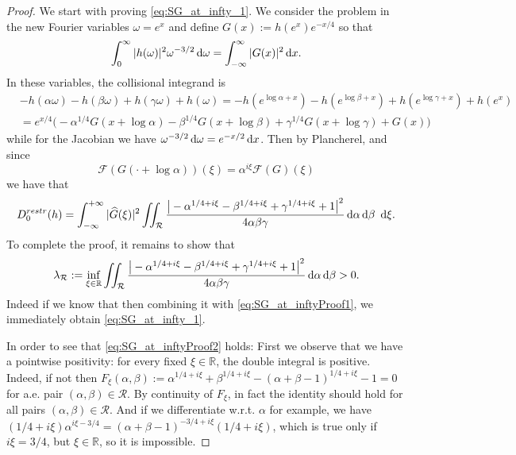 \documentclass[reqno,11pt,letterpaper]{amsart}
\numberwithin{equation}{section}
\newcommand{\dd}{\, {\rm d}}
\begin{document}
\begin{proof}
    We start with proving \eqref{eq:SG_at_infty_1}. We consider the problem in the new Fourier variables $\omega =e^x $ and define $G(x) := h(e^x) e^{-x/4}$ so that 
    \begin{align} \label{eq:SG_at_inftyProof1}
        \int_0^\infty |h(\omega)|^2\omega^{-3/2} \dd\omega = \int_{-\infty}^\infty |G(x)|^2 \dd x.
    \end{align} 
    In these variables, the collisional integrand is
\begin{align*}
    &- h(\alpha \omega) - h(\beta \omega) + h(\gamma \omega) + h(\omega) = - h(e^{\log \alpha + x}) - h(e^{\log \beta + x}) + h(e^{\log \gamma + x}) + h(e^x)
    \\ & = e^{x/4} \Big( -\alpha^{1/4} G(x+\log \alpha) -\beta^{1/4} G(x+\log \beta) + \gamma^{1/4} G(x+\log \gamma) + G(x) \Big)  
\end{align*}
while for the Jacobian we have $\omega^{-3/2}\dd\omega = e^{-x/2}\dd x$. Then by Plancherel, and since 
$$ \mathcal{F}(G(\cdot+\log \alpha))(\xi) = \alpha^{i\xi} \mathcal{F}(G)(\xi)$$ we have that 
$$
D_0^{restr}(h) = \int_{-\infty}^{+\infty} |\widehat{G}(\xi)|^2 \iint_{\mathcal{R}} \frac{\big\vert -\alpha^{1/4+i\xi} - \beta^{1/4+i\xi}+
            \gamma^{1/4+i\xi}+1
        \big\vert^2}{4\alpha\beta\gamma} 
 \dd\alpha\dd\beta\ \dd \xi.
$$
To complete the proof, it remains to show that \begin{align}\label{eq:SG_at_inftyProof2}
    \lambda_{\mathcal{R}}:= \inf_{\xi \in \mathbb{R}} \iint_{\mathcal{R}} \frac{\big\vert -\alpha^{1/4+i\xi} - \beta^{1/4+i\xi}+
            \gamma^{1/4+i\xi}+1
        \big\vert^2}{4\alpha\beta\gamma} 
 \dd\alpha\dd\beta > 0.
\end{align}
Indeed if we know that then combining it with \eqref{eq:SG_at_inftyProof1}, we immediately obtain \eqref{eq:SG_at_infty_1}. 

In order to see that \eqref{eq:SG_at_inftyProof2} holds: 
First we observe that we have a pointwise positivity: for every fixed $\xi \in \mathbb{R}$, the double integral is positive. Indeed, if not then $F_\xi (\alpha, \beta):= \alpha^{1/4+i\xi} + \beta^{1/4+i\xi}-
            (\alpha+\beta-1)^{1/4+i\xi}-1=0$ for a.e. pair $(\alpha, \beta) \in \mathcal{R}$. By continuity of $F_\xi$, in fact the identity should hold for all pairs $(\alpha, \beta) \in \mathcal{R}$. And if we differentiate w.r.t. $\alpha$ for example, we have $(1/4+i\xi)\alpha^{i\xi -3/4} = (\alpha+\beta-1)^{-3/4+i\xi}(1/4+i\xi)$, which is true only if $i\xi=3/4$, but $\xi \in \mathbb{R}$, so it is impossible. 


\end{proof}
\end{document}
